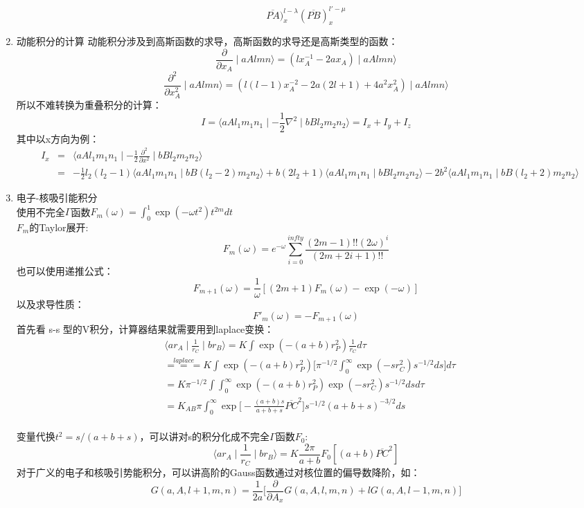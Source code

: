 \documentclass[11pt]{article}
\begin{document}
\begin{enumerate}
\[  \overline{PA})_x^{l-\lambda}(\overline{PB})_x^{l'-\mu}\]
\item
  动能积分的计算
  动能积分涉及到高斯函数的求导，高斯函数的求导还是高斯类型的函数：
  \[\frac{\partial}{\partial x_A} \mid aAlmn \rangle = (lx_A^{-1}-2ax_A) \mid aAlmn \rangle\]
  \[\frac{\partial^2}{\partial x_A^2} \mid aAlmn \rangle = (l(l-1)x_A^{-2}-2a(2l+1)+4a^2x_A^2) \mid aAlmn \rangle \]
  所以不难转换为重叠积分的计算：
  \[I=  \langle aAl_1m_1n_1 \mid -\frac{1}{2}\nabla^2 \mid bBl_2m_2n_2\rangle = I_x + I_y + I_z \]
  其中以x方向为例： \[\begin{eqnarray}
  & I_x &=& \langle aAl_1m_1n_1 \mid -\frac{1}{2}\frac{\partial^2}{\partial x^2} \mid bBl_2m_2n_2\rangle \\
  &&=& -\frac{1}{2}l_2(l_2-1)\langle aAl_1m_1n_1 \mid bB(l_2-2)m_2n_2\rangle +
   b(2l_2+1)\langle aAl_1m_1n_1 \mid bBl_2m_2n_2\rangle -
  2b^2\langle aAl_1m_1n_1 \mid bB(l_2+2)m_2n_2\rangle 
  \end{eqnarray}\]
\item
  电子-核吸引能积分\\
  使用不完全\(\Gamma\)函数\(F_m(\omega)=\int_0^1 \exp(-\omega t^2)t^{2m}dt\)\\
  \(F_m\)的Taylor展开:
  \[F_m(\omega) = e^{-\omega}\sum_{i=0}^{infty}\frac{(2m-1)!!(2\omega)^i}{(2m+2i+1)!!}\]
  也可以使用递推公式：
  \[F_{m+1}(\omega) = \frac{1}{\omega}[(2m+1)F_m(\omega)-\exp(-\omega)]\]
  以及求导性质： \[F'_m(\omega) = - F_{m+1}(\omega)\] 首先看 s-s
  型的V积分，计算器结果就需要用到laplace变换： \[\begin{eqnarray}
  &\langle ar_A \mid \frac{1}{r_C} \mid br_B \rangle = K \int \exp(-(a+b)r_P^2)\frac{1}{r_C}d\tau \\
  &\overset{laplace}{===} K \int \exp(-(a+b)r_P^2) \Big[\pi^{-1/2}\int_0^\infty \exp(-sr_C^2)s^{-1/2}ds \Big]d\tau \\
  &= K\pi^{-1/2} \int\int_0^\infty \exp(-(a+b)r_P^2)\exp(-sr_C^2)s^{-1/2}dsd\tau \\
  &= K_{AB}\pi \int_0^\infty \exp\Big[-\frac{(a+b)s}{a+b+s}\overline{PC}^2\Big]s^{-1/2}(a+b+s)^{-3/2}ds 
  \end{eqnarray}\]\\
  变量代换\(t^2=s/(a+b+s)\)，可以讲对s的积分化成不完全\(\Gamma\)函数\(F_0\):
  \[\langle ar_A \mid \frac{1}{r_C} \mid br_B \rangle = K \frac{2\pi}{a+b}F_0[(a+b)\overline{PC}^2]\]
  对于广义的电子和核吸引势能积分，可以讲高阶的Gauss函数通过对核位置的偏导数降阶，如：
  \[G(a,A,l+1,m,n)=\frac{1}{2a}\Big[\frac{\partial}{\partial A_x}G(a,A,l,m,n) + lG(a,A,l-1,m,n)\Big]\]

\end{enumerate}
\end{document}
